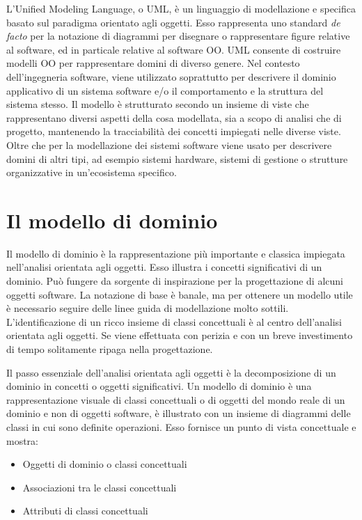 L'Unified Modeling Language, o UML, è un linguaggio di modellazione e specifica basato sul paradigma orientato agli oggetti. Esso rappresenta 
uno standard {\itshape de facto} per la notazione di diagrammi per disegnare o rappresentare figure relative al software, ed in particale relative al software OO.
UML consente di costruire modelli OO per rappresentare domini di diverso genere. Nel contesto dell'ingegneria software, viene utilizzato soprattutto per descrivere il dominio applicativo di un sistema software e/o il comportamento e la struttura del sistema stesso.
Il modello è strutturato secondo un insieme di viste che rappresentano diversi aspetti della cosa modellata, sia a scopo di analisi che di progetto, mantenendo la tracciabilità dei concetti impiegati nelle diverse viste. Oltre che per la modellazione dei sistemi software viene usato per descrivere domini di altri tipi, ad esempio sistemi hardware, sistemi di gestione o strutture organizzative in un'ecosistema specifico. 

\newpage

\section{Il modello di dominio} %
\label{sec:il_modello_di_dominio}

Il modello di dominio è la rappresentazione più importante e classica impiegata nell’analisi orientata agli oggetti. Esso illustra i concetti significativi di un dominio. Può fungere da sorgente di inspirazione per la progettazione di alcuni oggetti software.
La notazione di base è banale, ma per ottenere un modello utile è necessario seguire delle linee guida di modellazione molto sottili.
L’identificazione di un ricco insieme di classi concettuali è al centro dell’analisi orientata agli oggetti. Se viene effettuata con perizia e con un breve investimento di tempo solitamente ripaga nella progettazione.

Il passo essenziale dell’analisi orientata agli oggetti è la decomposizione di un dominio in concetti o oggetti significativi. 
Un modello di dominio è una rappresentazione visuale di classi concettuali o di oggetti del mondo reale di un dominio e non di oggetti software, è illustrato con un insieme di diagrammi delle classi in cui sono definite operazioni. Esso fornisce un punto di vista concettuale e mostra: 

\begin{itemize}
    \item Oggetti di dominio o classi concettuali
    \item Associazioni tra le classi concettuali
    \item Attributi di classi concettuali
\end{itemize}

